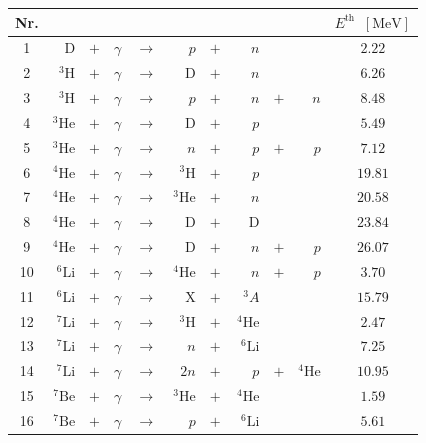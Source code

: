 \documentclass[11pt,a4paper]{article}
\begin{document}
\begin{table}
	\centering
	\begin{tabular}{|c|rcrcrcrcr|c|}
		\hline
		 Nr. & & & & & & & & & & $E^\text{th}\;\;[\mathrm{MeV}]$\\
		\hline\hline
		1 & $\mathrm{D}$ & $+$ & $\gamma$ & $\rightarrow$ & $p$ & $+$ & $n$ & & & $2.22$\\
		\hline
		2 & $^3\mathrm{H}$ & $+$ & $\gamma$ & $\rightarrow$ & $\mathrm{D}$ & $+$ & $n$ & & & $6.26$\\
		\hline
		3 & $^3\mathrm{H}$ & $+$ & $\gamma$ & $\rightarrow$ & $p$ & $+$ & $n$ & $+$ & $n$ & $8.48$ \\
		\hline
		4 & $^3\mathrm{He}$ & $+$ & $\gamma$ & $\rightarrow$ & $\mathrm{D}$ & $+$ & $p$ & & & $5.49$ \\
		\hline
		5 & $^3\mathrm{He}$ & $+$ & $\gamma$ & $\rightarrow$ & $n$ & $+$ & $p$ & $+$ & $p$ & $7.12$\\
		\hline
		6 & $^4\mathrm{He}$ & $+$ & $\gamma$ & $\rightarrow$ & $^3\mathrm{H}$ & $+$ & $\, p$ & & & $19.81$ \\
		\hline
		7 & $^4\mathrm{He}$ & $+$ & $\gamma$ & $\rightarrow$ & $^{3}\mathrm{He}$ & $+$ & $n$ & & & $20.58$ \\
		\hline
		8 & $^4\mathrm{He}$ & $+$ & $\gamma$ & $\rightarrow$ & $\mathrm{D}$ & $+$ & $\mathrm{D}$ & & & $23.84$ \\
		\hline
		9 & $^4\mathrm{He}$ & $+$ & $\gamma$ & $\rightarrow$ & $\mathrm{D}$ & $+$ & $n$ & $+$ & $p$ & $26.07$ \\
		\hline
		10 & $^6\mathrm{Li}$ & $+$ & $\gamma$ & $\rightarrow$ & $\, ^{4}\mathrm{He}$ & $+$ & $n$ & $+$ & $p$ & $3.70$ \\
		\hline
		11 & $^6\mathrm{Li}$ & $+$ & $\gamma$ & $\rightarrow$ & $\mathrm{X}$ & $+$ &  $\, ^{3}A$ & & & $15.79$ \\
		\hline
		12 & $^7\mathrm{Li}$ & $+$ & $\gamma$ & $\rightarrow$ & $^3\text{H}$ & $+$ &  $\, ^{4}\text{He}$ & & & $2.47$ \\
		\hline
		13 & $^7\mathrm{Li}$ & $+$ & $\gamma$ & $\rightarrow$ & $n$ & $+$ &  $\, ^{6}\text{Li}$ & & & $7.25$ \\
		\hline
		14 & $^7\mathrm{Li}$ & $+$ & $\gamma$ & $\rightarrow$ & $2n$ & $+$ &  $p$ & $+$ & $ ^{4}\text{He}$ & $10.95$ \\
		\hline
		15 & $^7\mathrm{Be}$ & $+$ & $\gamma$ & $\rightarrow$ & $^3\text{He}$ & $+$ &  $ ^{4}\text{He}$ & & & $1.59$ \\
		\hline
		16 & $^7\mathrm{Be}$ & $+$ & $\gamma$ & $\rightarrow$ & $p$ & $+$ &  $ ^{6}\text{Li}$ & & & $5.61$ \\

\end{tabular}
\end{table}
\end{document}
